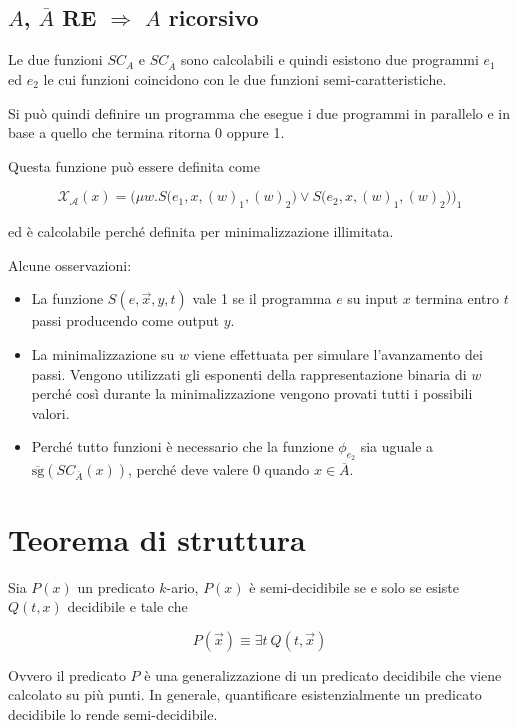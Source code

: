 \subsection{$A$, $\overline{A}$ RE $\Rightarrow$ $A$ ricorsivo}

Le due funzioni $SC_A$ e $SC_{\overline{A}}$ sono calcolabili e quindi esistono due programmi $e_1$ ed $e_2$ le cui funzioni coincidono con le due funzioni semi-caratteristiche.

Si può quindi definire un programma che esegue i due programmi in parallelo e in base a quello che termina ritorna 0 oppure 1.

Questa funzione può essere definita come 

$$
\mathcal{X_A}(x) = \Bigg( \mu w . S\bigg( e_1, x, (w)_1, (w)_2\bigg)  \vee S\bigg( e_2, x, (w)_1, (w)_2\bigg)  \Bigg)_1
$$

ed è calcolabile perché definita per minimalizzazione illimitata.

Alcune osservazioni:

\begin{itemize}
	\item La funzione $S(e, \vec{x}, y, t)$ vale 1 se il programma $e$ su input $x$ termina entro $t$ passi producendo come output $y$.
	\item La minimalizzazione su $w$ viene effettuata per simulare l'avanzamento dei passi. Vengono utilizzati gli esponenti della rappresentazione binaria di $w$ perché così durante la minimalizzazione vengono provati tutti i possibili valori.
	\item Perché tutto funzioni è necessario che la funzione $\phi_{e_2}$ sia uguale a $\overline{\text{sg}} (SC_{\overline{A}} (x))$, perché deve valere 0 quando $x \in \overline{A}$.
\end{itemize}

\section{Teorema di struttura}

Sia $P(x)$ un predicato $k$-ario, $P(x)$ è semi-decidibile se e solo se esiste $Q(t,x)$ decidibile e tale che

$$
P(\vec{x}) \equiv \exists t \: Q(t,\vec{x})
$$

Ovvero il predicato $P$ è una generalizzazione di un predicato decidibile che viene calcolato su più punti. In generale, quantificare esistenzialmente un predicato decidibile lo rende semi-decidibile.

